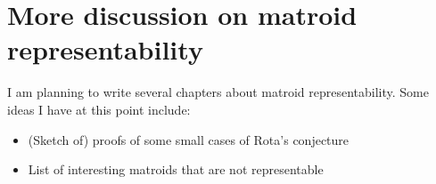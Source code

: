 \section{More discussion on matroid representability}
I am planning to write several chapters about matroid representability.
Some ideas I have at this point include:

\begin{itemize}
\item (Sketch of) proofs of some small cases of Rota's conjecture
\item List of interesting matroids that are not representable
\end{itemize}

